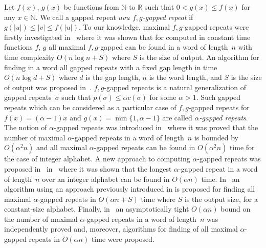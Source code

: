 \documentclass{article}
\begin{document}
Let $f(x)$, $g(x)$ be functions from $\mathbb {N}$ to $\mathbb {R}$ such
that $0<g(x)\le f(x)$ for any $x\in \mathbb {N}$. We call a gapped repeat
$uvu$ {\it $f,g$-gapped repeat} if $g(|u|)\le |v|\le f(|u|)$. To our knowledge,
maximal $f,g$-gapped repeats were firstly investigated in~\cite{Brodal00} where
it was shown that for computed in constant time functions $f$, $g$ all maximal  
$f,g$-gapped can be found in a word of length~$n$ with time complexity $O(n\log n+S)$ 
where $S$ is the size of output. An algorithm for finding in a word all gapped repeats 
with a fixed gap length in time $O(n\log d+S)$ where $d$ is the gap length, $n$ is the 
word length, and  $S$ is the size of output was proposed in~\cite{KK00a}. 
$f,g$-gapped repeats is a natural generalization of gapped repeats~$\sigma$
such that $p(\sigma)\le\alpha c(\sigma)$ for some $\alpha >1$. Such gapped repeats
which can be considered as a particular case of $f,g$-gapped repeats for
$f(x)=(\alpha -1)x$ and $g(x)=\min \{1, \alpha -1\}$ are called {\it $\alpha$-gapped repeats}.
The notion of $\alpha$-gapped repeats was introduced in~\cite{KPPHr13} where 
it was proved that the number of maximal $\alpha$-gapped repeats  in a word of 
length~$n$ is bounded by $O(\alpha^2 n)$ and all maximal $\alpha$-gapped repeats 
can be found in $O(\alpha^2 n)$ time for the case of integer alphabet. A new approach 
to computing $\alpha$-gapped repeats was proposed in~\cite{GabrMan} in~\cite{GabrMan} 
where it was shown that the longest $\alpha$-gapped repeat in a word of length~$n$ 
over an integer alphabet can be found in $O(\alpha n)$ time. In~\cite{Tanimuraetal} 
an algorithm using an approach previously introduced in \cite{BadkobehCrochToop12} 
is proposed for finding all maximal $\alpha$-gapped repeats in $O(\alpha n+S)$ time 
where $S$ is the output size, for a constant-size alphabet. Finally, in~\cite{LATA16,GawrychowskiIIK16}
an asymptotically tight $O(\alpha n)$ bound on the number of maximal $\alpha$-gapped repeats 
in a word of length~$n$ was independently proved and, moreover, algorithms for finding of
all maximal $\alpha$-gapped repeats in $O(\alpha n)$ time were proposed.
\end{document}
